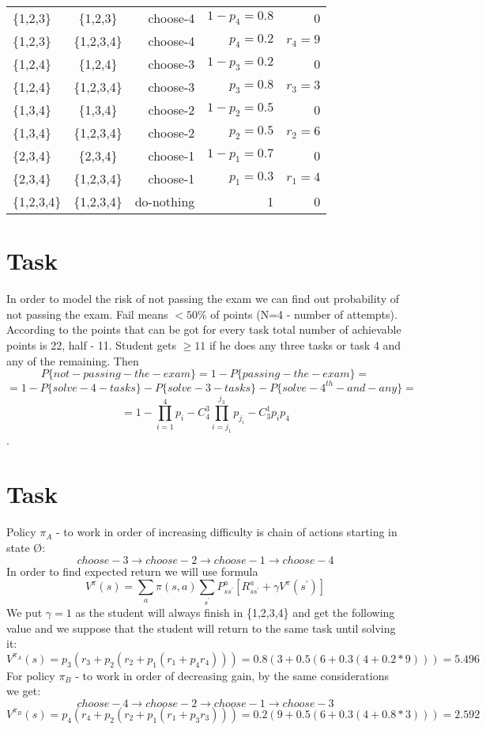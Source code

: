 \documentclass[english]{scrartcl}
\begin{document}
\begin{tabular}{ l | c | r | r | r }
  \{1,2,3\} & \{1,2,3\} & choose-4 & $1 - p_{4}=0.8$ & 0 \\
  \{1,2,3\} & \{1,2,3,4\} & choose-4 & $p_{4}=0.2$ & $r_{4}=9$ \\
  \{1,2,4\} & \{1,2,4\} & choose-3 & $1 - p_{3}=0.2$ & 0 \\
  \{1,2,4\} & \{1,2,3,4\} & choose-3 & $p_{3}=0.8$ & $r_{3}=3$ \\
  \{1,3,4\} & \{1,3,4\} & choose-2 & $1 - p_{2}=0.5$ & 0 \\
  \{1,3,4\} & \{1,2,3,4\} & choose-2 & $p_{2}=0.5$ & $r_{2}=6$ \\
  \{2,3,4\} & \{2,3,4\} & choose-1 & $1 - p_{1}=0.7$ & 0 \\
  \{2,3,4\} & \{1,2,3,4\} & choose-1 & $p_{1}=0.3$ & $r_{1}=4$ \\
  \{1,2,3,4\} & \{1,2,3,4\} & do-nothing & 1 & 0
\end{tabular}

\section{Task}
In order to model the risk of not passing the exam we can find out probability of not passing the exam. Fail means $< 50\%$ of points (N=4 - number of attempts). According to the points that can be got for every task total number of achievable points is 22, half - 11. Student gets $\geq 11$ if he does any three tasks or task 4 and any of the remaining. Then $$P\{not-passing-the-exam\}=1 - P\{passing-the-exam\}=$$ $$=1 - P\{solve-4-tasks\} - P\{solve-3-tasks\} - P\{solve-4^{th}-and-any\}=$$ $$= 1 - \prod_{i=1}^{4}{p_{i}} - C_{4}^{3}\prod_{i=j_{1}}^{j_{3}}{p_{j_{i}}} - C_{3}^{1}p_{i}p_{4}$$.

\section{Task}
Policy $\pi_{A}$ - to work in order of increasing difficulty is chain of actions starting in state \O:
$$choose-3 \rightarrow choose-2 \rightarrow choose-1 \rightarrow choose-4$$
In order to find expected return we will use formula $$V^{\pi}(s)=\sum_{a}\pi(s,a)\sum_{s^{\prime}}P^{a}_{ss^{\prime}}[R^{a}_{ss^{\prime}}+\gamma V^{\pi}(s^{\prime})]$$
We put $\gamma=1$ as the student will always finish in \{1,2,3,4\} and get the following value and we suppose that the student will return to the same task until solving it:
$$V^{\pi_{A}}(s)=p_{3}(r_{3} + p_{2}(r_{2} + p_{1}(r_{1} + p_{4}r_{4})))=0.8(3 + 0.5(6 + 0.3(4 + 0.2*9)))=5.496$$
For policy $\pi_{B}$ - to work in order of decreasing gain, by the same considerations we get:
$$choose-4 \rightarrow choose-2 \rightarrow choose-1 \rightarrow choose-3$$
$$V^{\pi_{B}}(s)=p_{4}(r_{4} + p_{2}(r_{2} + p_{1}(r_{1} + p_{3}r_{3})))=0.2(9 + 0.5(6 + 0.3(4 + 0.8*3)))=2.592$$
\end{document}
